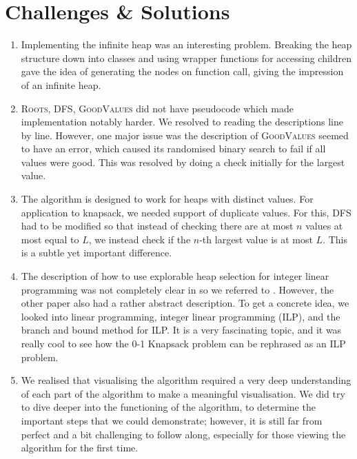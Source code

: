 \documentclass{article}
\begin{document}
\section{Challenges \& Solutions}
\begin{enumerate}
    \item Implementing the infinite heap was an interesting problem. Breaking the heap structure down into classes and using wrapper functions for accessing children gave the idea of generating the nodes on function call, giving the impression of an infinite heap.
    \item \textsc{Roots}, \textsc{DFS}, \textsc{GoodValues} did not have pseudocode which made implementation notably harder. We resolved to reading the descriptions line by line. However, one major issue was the description of \textsc{GoodValues} seemed to have an error, which caused its randomised binary search to fail if all values were good. This was resolved by doing a check initially for the largest value.
    \item The algorithm is designed to work for heaps with distinct values. For application to knapsack, we needed support of duplicate values. For this, \textsc{DFS} had to be modified so that instead of checking there are at most $n$ values at most equal to $L$, we instead check if the $n$-th largest value is at most $L$. This is a subtle yet important difference.
    \item The description of how to use explorable heap selection for integer linear programming was not completely clear in \cite{Borst2025} so we referred to \cite{karp1986search}. However, the other paper also had a rather abstract description. To get a concrete idea, we looked into linear programming, integer linear programming (ILP), and the branch and bound method for ILP. It is a very fascinating topic, and it was really cool to see how the 0-1 Knapsack problem can be rephrased as an ILP problem.
    \item We realised that visualising the algorithm required a very deep understanding of each part of the algorithm to make a meaningful visualisation. We did try to dive deeper into the functioning of the algorithm, to determine the important steps that we could demonstrate; however, it is still far from perfect and a bit challenging to follow along, especially for those viewing the algorithm for the first time.
\end{enumerate} 
\end{document}
